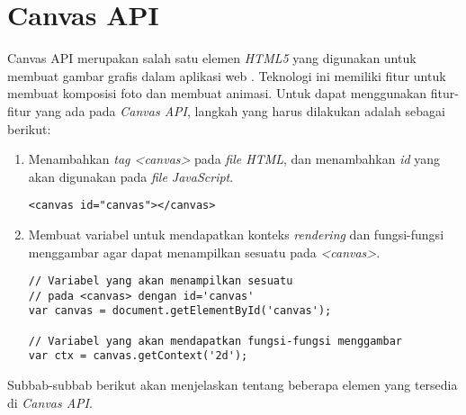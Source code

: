 
 

\section{Canvas API}
\label{sec:Canvas API}
 
Canvas API merupakan salah satu elemen \textit{HTML5} yang digunakan untuk membuat gambar grafis dalam aplikasi web \cite{canvas}. Teknologi ini memiliki fitur untuk membuat komposisi foto dan membuat animasi. Untuk dapat menggunakan fitur-fitur yang ada pada \textit{Canvas API}, langkah yang harus dilakukan adalah sebagai berikut:
\begin{enumerate}
	\item Menambahkan \textit{tag <canvas>} pada \textit{file HTML}, dan menambahkan \textit{id} yang akan digunakan pada \textit{file JavaScript}.
\begin{lstlisting}
<canvas id="canvas"></canvas>
\end{lstlisting}
	
	\item Membuat variabel untuk mendapatkan konteks \textit{rendering} dan fungsi-fungsi menggambar agar dapat menampilkan sesuatu pada \textit{<canvas>}.
\begin{lstlisting}
// Variabel yang akan menampilkan sesuatu 
// pada <canvas> dengan id='canvas'
var canvas = document.getElementById('canvas'); 
	
// Variabel yang akan mendapatkan fungsi-fungsi menggambar 
var ctx = canvas.getContext('2d');
\end{lstlisting}
\end{enumerate}

Subbab-subbab berikut akan menjelaskan tentang beberapa elemen yang tersedia di \textit{Canvas API}.



